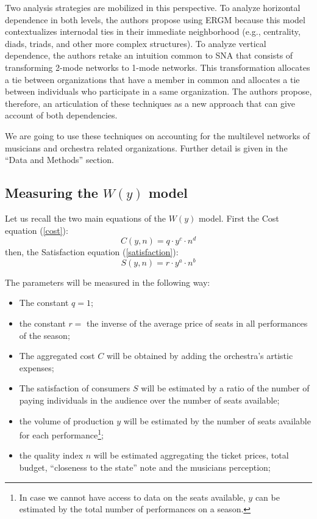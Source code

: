 \documentclass[a4paper, 12pt, openright, oneside, german, french, brazil, english]{abntex2}
\begin{document}
	Two analysis strategies are mobilized in this perspective. To analyze horizontal dependence in both levels, the authors propose using ERGM because this model contextualizes internodal ties in their immediate neighborhood (e.g., centrality, diads, triads, and other more complex structures). To analyze vertical dependence, the authors retake an intuition common to SNA that consists of transforming 2-mode networks to 1-mode networks. This transformation allocates a tie between organizations that have a member in common and allocates a tie between individuals who participate in a same organization. The authors propose, therefore, an articulation of these techniques as a new approach that can give account of both dependencies.

        We are going to use these techniques on accounting for the multilevel networks of musicians and orchestra related organizations. Further detail is given in the ``Data and Methods'' section.
	
	

        

        \subsection{Measuring the $W(y)$ model}

        Let us recall the two main equations of the $W(y)$ model. First the Cost equation (\ref{cost}):
	$$C(y, n) = q \cdot y^c \cdot n^d$$
        then, the Satisfaction equation (\ref{satisfaction}):
        $$S(y, n) = r \cdot y^a \cdot n^b$$

        The parameters will be measured in the following way:

        \begin{itemize}
        \item The constant $q = 1$;
        \item the constant $r =$ the inverse of the average price of seats in all performances of the season;
        \item The aggregated cost $C$ will be obtained by adding the orchestra's artistic expenses;
        \item The satisfaction of consumers $S$ will be estimated by a ratio of the number of paying individuals in the audience over the number of seats available;
        \item the volume of production $y$ will be estimated by the number of seats available for each performance\footnote{In case we cannot have access to data on the seats available, $y$ can be estimated by the total number of performances on a season.};
        \item the quality index $n$ will be estimated aggregating the ticket prices, total budget, ``closeness to the state'' note and the musicians perception;
        \end{itemize}
\end{document}
